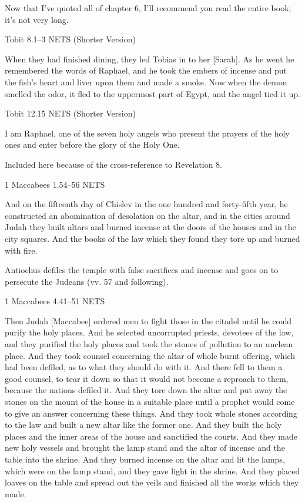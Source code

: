 \documentclass[
]{article}
\newcommand{\RL}[1]{\beginR #1\endR}
\begin{document}
Now that I've quoted all of chapter 6, I'll recommend you read the
entire book; it's not very long.

Tobit 8.1--3 NETS (Shorter Version)

When they had finished dining, they led Tobias in to her {[}Sarah{]}. As
he went he remembered the words of Raphael, and he took the embers of
incense and put the fish\RL{'}s heart and liver upon them and made a
smoke. Now when the demon smelled the odor, it fled to the uppermost
part of Egypt, and the angel tied it up.

Tobit 12.15 NETS (Shorter Version)

I am Raphael, one of the seven holy angels who present the prayers of
the holy ones and enter before the glory of the Holy One.

Included here because of the cross-reference to Revelation 8.

1 Maccabees 1.54--56 NETS

And on the fifteenth day of Chislev in the one hundred and forty-fifth
year, he constructed an abomination of desolation on the altar, and in
the cities around Judah they built altars and burned incense at the
doors of the houses and in the city squares. And the books of the law
which they found they tore up and burned with fire.

Antiochus defiles the temple with false sacrifices and incense and goes
on to persecute the Judeans (vv. 57 and following).

1 Maccabees 4.41--51 NETS

Then Judah {[}Maccabee{]} ordered men to fight those in the citadel
until he could purify the holy places. And he selected uncorrupted
priests, devotees of the law, and they purified the holy places and took
the stones of pollution to an unclean place. And they took counsel
concerning the altar of whole burnt offering, which had been defiled, as
to what they should do with it. And there fell to them a good counsel,
to tear it down so that it would not become a reproach to them, because
the nations defiled it. And they tore down the altar and put away the
stones on the mount of the house in a suitable place until a prophet
would come to give an answer concerning these things. And they took
whole stones according to the law and built a new altar like the former
one. And they built the holy places and the inner areas of the house and
sanctified the courts. And they made new holy vessels and brought the
lamp stand and the altar of incense and the table into the shrine. And
they burned incense on the altar and lit the lamps, which were on the
lamp stand, and they gave light in the shrine. And they placed loaves on
the table and spread out the veils and finished all the works which they
made.
\end{document}
